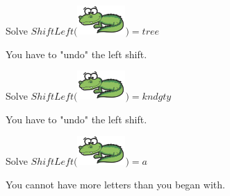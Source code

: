 \documentclass{ximera}
\begin{document}
\begin{question}
Solve $ShiftLeft($\includegraphics{pics/alligator.png}$) = tree$
\begin{multipleChoice}
\end{multipleChoice}
\begin{feedback}
You have to "undo" the left shift.
\end{feedback}
\end{question}




\begin{question}
Solve $ShiftLeft($\includegraphics{pics/alligator.png}$) = kndgty$
\begin{multipleChoice}
\end{multipleChoice}
\begin{feedback}
You have to "undo" the left shift.
\end{feedback}
\end{question}



\begin{question}
Solve $ShiftLeft($\includegraphics{pics/alligator.png}$) = a$
\begin{multipleChoice}
\end{multipleChoice}
\begin{feedback}
You cannot have more letters than you began with.
\end{feedback}
\end{question}
\end{document}
